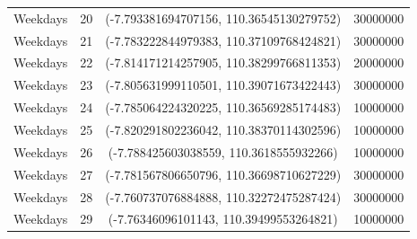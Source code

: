 \documentclass{skripsimathugm}
\begin{document}
\begin{table}[H]
\begin{tabular}{|c|c|c|c|}
Weekdays & 20 & (-7.793381694707156, 110.36545130279752) & 30000000 \\
Weekdays & 21 & (-7.783222844979383, 110.37109768424821) & 30000000 \\
Weekdays & 22 & (-7.814171214257905, 110.38299766811353) & 20000000 \\
Weekdays & 23 & (-7.805631999110501, 110.39071673422443) & 30000000 \\
Weekdays & 24 & (-7.785064224320225, 110.36569285174483) & 10000000 \\
Weekdays & 25 & (-7.820291802236042, 110.38370114302596) & 10000000 \\
Weekdays & 26 & (-7.788425603038559, 110.3618555932266) & 10000000 \\
Weekdays & 27 & (-7.781567806650796, 110.36698710627229) & 30000000 \\
Weekdays & 28 & (-7.760737076884888, 110.32272475287424) & 30000000 \\
Weekdays & 29 & (-7.76346096101143, 110.39499553264821) & 10000000 \\

\hline
\end{tabular}
\end{table}
\end{document}
